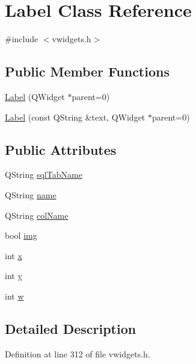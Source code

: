 \hypertarget{classLabel}{
\section{Label Class Reference}
\label{classLabel}
}


{\ttfamily \#include $<$vwidgets.h$>$}

\subsection*{Public Member Functions}
\begin{DoxyCompactItemize}
\item 
\hyperlink{classLabel_a8f43a231b00daa09d72a7263dca2b107}{Label} (QWidget $\ast$parent=0)
\item 
\hyperlink{classLabel_a24fbd6634f58ecd6c2f6db26dea484db}{Label} (const QString \&text, QWidget $\ast$parent=0)
\end{DoxyCompactItemize}
\subsection*{Public Attributes}
\begin{DoxyCompactItemize}
\item 
QString \hyperlink{classLabel_a5584bf11b1059f5c48ee4ed0e074e5b3}{sqlTabName}
\item 
QString \hyperlink{classLabel_a9456abb423939d68c1671b796abf92d8}{name}
\item 
QString \hyperlink{classLabel_a484912d15ccb6b509a438ded54ec4db8}{colName}
\item 
bool \hyperlink{classLabel_a41e67ddc798145020945bf373032788d}{img}
\item 
int \hyperlink{classLabel_a8339b81ceaa1dab691f57cea88886e86}{x}
\item 
int \hyperlink{classLabel_af7de5d7b7af764667a51747ba6fd5a2e}{y}
\item 
int \hyperlink{classLabel_ac1b8873ac4b399c5f70305b08aa7f5c8}{w}
\end{DoxyCompactItemize}


\subsection{Detailed Description}


Definition at line 312 of file vwidgets.h.



